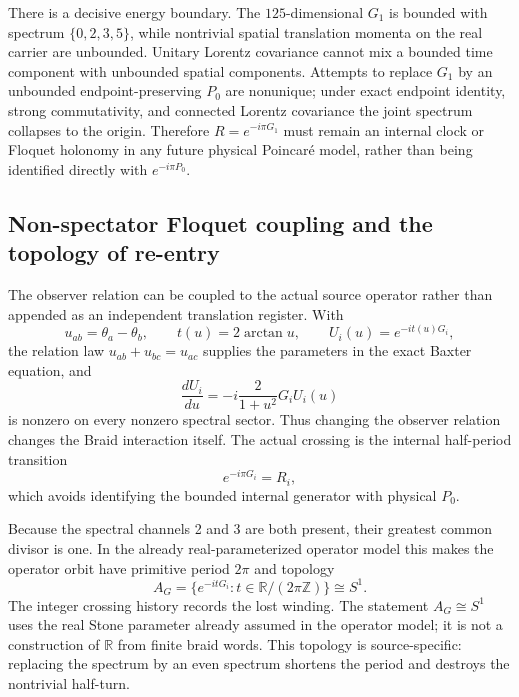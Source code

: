 \documentclass[11pt]{article}
\theoremstyle{definition}
\theoremstyle{remark}
\begin{document}
There is a decisive energy boundary. The $125$-dimensional $G_1$ is bounded with spectrum $\{0,2,3,5\}$, while nontrivial spatial translation momenta on the real carrier are unbounded. Unitary Lorentz covariance cannot mix a bounded time component with unbounded spatial components. Attempts to replace $G_1$ by an unbounded endpoint-preserving $P_0$ are nonunique; under exact endpoint identity, strong commutativity, and connected Lorentz covariance the joint spectrum collapses to the origin. Therefore $R=e^{-i\pi G_1}$ must remain an internal clock or Floquet holonomy in any future physical Poincar\'e model, rather than being identified directly with $e^{-i\pi P_0}$.

\subsection{Non-spectator Floquet coupling and the topology of re-entry}

The observer relation can be coupled to the actual source operator rather than appended as an independent translation register. With
\begin{equation}
 u_{ab}=\theta_a-\theta_b,\qquad t(u)=2\arctan u,\qquad U_i(u)=e^{-it(u)G_i},
\end{equation}
the relation law $u_{ab}+u_{bc}=u_{ac}$ supplies the parameters in the exact Baxter equation, and
\begin{equation}
 \frac{dU_i}{du}=-i\frac{2}{1+u^2}G_iU_i(u)
\end{equation}
is nonzero on every nonzero spectral sector. Thus changing the observer relation changes the Braid interaction itself. The actual crossing is the internal half-period transition
\begin{equation}
 e^{-i\pi G_i}=R_i,
\end{equation}
which avoids identifying the bounded internal generator with physical $P_0$.

Because the spectral channels 2 and 3 are both present, their greatest common divisor is one. In the already real-parameterized operator model this makes the operator orbit have primitive period $2\pi$ and topology
\begin{equation}
 A_G=\{e^{-itG_i}:t\in\mathbb R/(2\pi\mathbb Z)\}\cong S^1.
\end{equation}
The integer crossing history records the lost winding. The statement $A_G\cong S^1$ uses the real Stone parameter already assumed in the operator model; it is not a construction of $\mathbb R$ from finite braid words. This topology is source-specific: replacing the spectrum by an even spectrum shortens the period and destroys the nontrivial half-turn.
\end{document}
